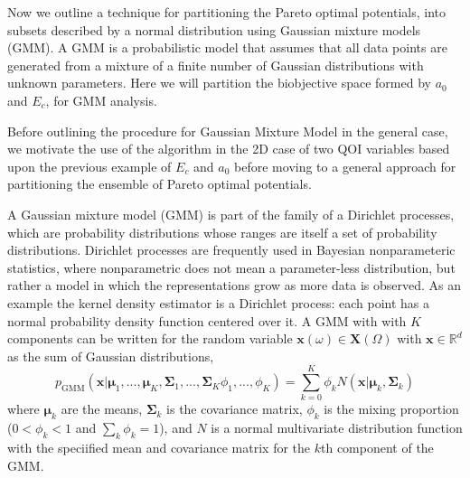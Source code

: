 Now we outline a technique for partitioning the Pareto optimal potentials, into subsets described by a normal distribution using Gaussian mixture models (GMM).\cite{reynolds2009_gmm_def}  A GMM is a probabilistic model that assumes that all data points are generated from a mixture of a finite number of Gaussian distributions with unknown parameters.  Here we will partition the biobjective space formed by $a_0$ and $E_c$, for GMM analysis.

Before outlining the procedure for Gaussian Mixture Model in the general case, we motivate the use of the algorithm in the 2D case of two QOI variables based upon the previous example of $E_c$ and $a_0$ before moving to a general approach for partitioning the ensemble of Pareto optimal potentials.

A Gaussian mixture model (GMM) is part of the family of a Dirichlet processes, which are probability distributions whose ranges are itself a set of probability distributions.\cite{west1994_mixturemodel}
Dirichlet processes are frequently used in Bayesian nonparameteric statistics, where nonparametric does not mean a parameter-less distribution, but rather a model in which the representations grow as more data is observed.  As an example the kernel density estimator is a Dirichlet process: each point has a normal probability density function centered over it.
A GMM with with $K$ components can be written for the random variable $\bm{x}(\omega) \in \bm{X}(\Omega)$ with $\bm{x} \in \mathbb{R}^d$ as the sum of Gaussian distributions,
\begin{equation}
\label{eq:gmm}
  p_{\text{GMM}}(\bm{x}|
                 \bm{\mu}_1,...,\bm{\mu}_K,
                 \bm{\Sigma}_1,...,\bm{\Sigma}_K
                 \phi_1,...,\phi_K)
  =
  \sum_{k=0}^K \phi_k N(\bm{x}|\bm{\mu}_k,\bm{\Sigma}_k)
\end{equation}
where $\bm{\mu}_k$ are the means, $\bm{\Sigma}_k$ is the covariance matrix, $\phi_k$ is the mixing proportion ($0<\phi_k<1$ and $\sum_k \phi_k = 1$), and $N$ is a normal multivariate distribution function with the speciified mean and covariance matrix for the $k$th component of the GMM.

